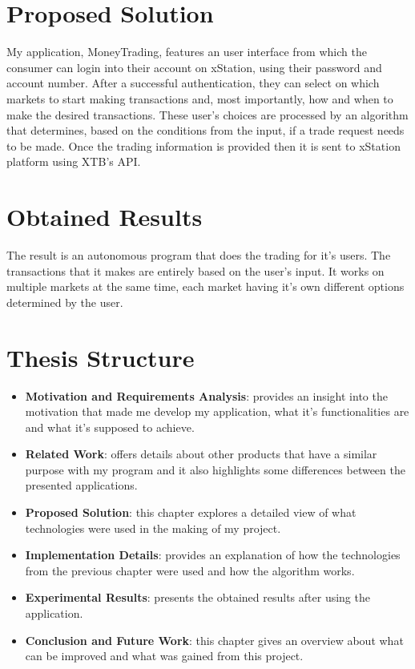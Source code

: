 \documentclass[12pt,a4paper]{report}
\begin{document}
\section{Proposed Solution} 
My application, MoneyTrading, features an user interface from which the consumer can login into their account on xStation, using their password and account number. After a successful authentication, they can select on which markets to start making transactions and, most importantly, how and when to make the desired transactions. These user's choices are processed by an algorithm that determines, based on the conditions from the input, if a trade request needs to be made. Once the trading information is provided then it is sent to xStation platform using XTB's API.
\section{Obtained Results}
The result is an autonomous program that does the trading for it's users. The transactions that it makes are entirely based on the user's input. It works on multiple markets at the same time, each market having it's own different options determined by the user. 
\section{Thesis Structure}
\begin{itemize}
	\item \textbf{Motivation and Requirements Analysis}: provides an insight into the motivation that made me develop my application, what it's functionalities are and what it's supposed to achieve.
	\item \textbf{Related Work}: offers details about other products that have a similar purpose with my program and it also highlights some differences between the presented applications.
	\item \textbf{Proposed Solution}: this chapter explores a detailed view of what technologies were used in the making of my project.
	\item \textbf{Implementation Details}: provides an explanation of how the technologies from the previous chapter were used and how the algorithm works.
	\item \textbf{Experimental Results}: presents the obtained results after using the application.
	\item \textbf{Conclusion and Future Work}: this chapter gives an overview about what can be improved and what was gained from this project.
\end{itemize}
\end{document}
